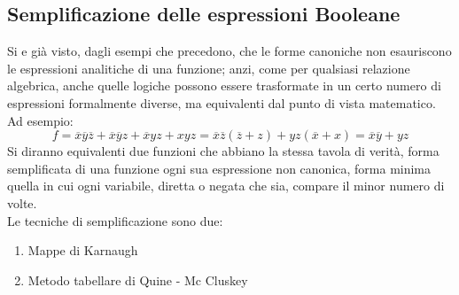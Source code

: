 \documentclass[a4paper]{extarticle}
\begin{document}
\subsection{Semplificazione delle espressioni Booleane}
Si e già visto, dagli esempi che precedono, che le forme canoniche non esauriscono le espressioni analitiche di una funzione; anzi, come per qualsiasi relazione algebrica, anche quelle logiche possono essere trasformate in un certo numero di espressioni formalmente diverse, ma equivalenti dal punto di vista matematico.\\
Ad esempio:
\[f = \overline{x} \overline{y} \overline{z} + \overline{x} \overline{y} z + \overline{x}yz + xyz = \overline{x} \overline{z} (\overline{z} + z) + yz (\overline{x} + x) = \overline{x} \overline{y} + yz\]
Si diranno equivalenti due funzioni che abbiano la stessa tavola di verità, forma semplificata di una funzione ogni sua espressione non canonica, forma minima quella in cui ogni variabile, diretta o negata che sia, compare il minor numero di volte.\\
Le tecniche di semplificazione sono due:
\begin{enumerate}
    \item Mappe di Karnaugh
    \item Metodo tabellare di Quine - Mc Cluskey
\end{enumerate}
\end{document}
